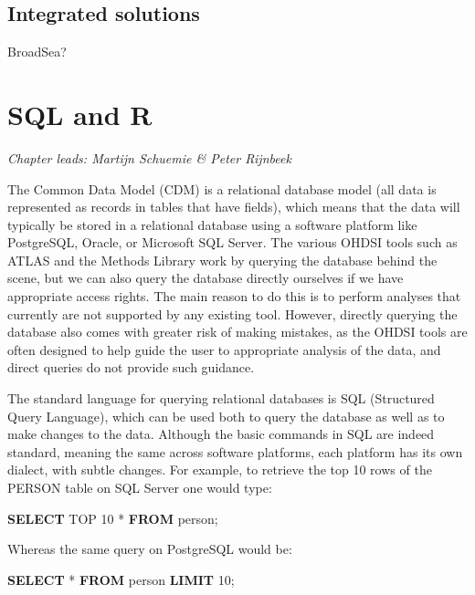 \documentclass[11pt]{book}
\newenvironment{Shaded}{\begin{snugshade}}{\end{snugshade}}
\newcommand{\KeywordTok}[1]{\textcolor[rgb]{0.13,0.29,0.53}{\textbf{#1}}}
\newcommand{\DecValTok}[1]{\textcolor[rgb]{0.00,0.00,0.81}{#1}}
\newcommand{\NormalTok}[1]{#1}
\begin{document}
\section{Integrated solutions}\label{integrated-solutions}

BroadSea?

\chapter{SQL and R}\label{SqlAndR}

\emph{Chapter leads: Martijn Schuemie \& Peter Rijnbeek}

The Common Data Model (CDM) is a relational database model (all data is
represented as records in tables that have fields), which means that the
data will typically be stored in a relational database using a software
platform like PostgreSQL, Oracle, or Microsoft SQL Server. The various
OHDSI tools such as ATLAS and the Methods Library work by querying the
database behind the scene, but we can also query the database directly
ourselves if we have appropriate access rights. The main reason to do
this is to perform analyses that currently are not supported by any
existing tool. However, directly querying the database also comes with
greater risk of making mistakes, as the OHDSI tools are often designed
to help guide the user to appropriate analysis of the data, and direct
queries do not provide such guidance.

The standard language for querying relational databases is SQL
(Structured Query Language), which can be used both to query the
database as well as to make changes to the data. Although the basic
commands in SQL are indeed standard, meaning the same across software
platforms, each platform has its own dialect, with subtle changes. For
example, to retrieve the top 10 rows of the PERSON table on SQL Server
one would type:

\begin{Shaded}
\begin{Highlighting}[]
\KeywordTok{SELECT}\NormalTok{ TOP }\DecValTok{10}\NormalTok{ * }\KeywordTok{FROM}\NormalTok{ person;}
\end{Highlighting}
\end{Shaded}

Whereas the same query on PostgreSQL would be:

\begin{Shaded}
\begin{Highlighting}[]
\KeywordTok{SELECT}\NormalTok{ * }\KeywordTok{FROM}\NormalTok{ person }\KeywordTok{LIMIT} \DecValTok{10}\NormalTok{;}
\end{Highlighting}
\end{Shaded}
\end{document}

